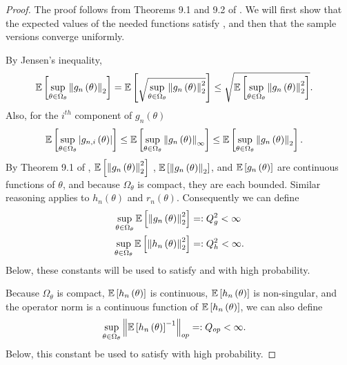 \begin{proof}
The proof follows from Theorems 9.1 and
9.2 of \citet{keener:2011:theoretical}. We will first show that the expected values of
the needed functions satisfy \coreassum, and then that the sample versions
converge uniformly.

By Jensen's inequality,
\begin{align*}
\mathbb{E}\left[\sup_{\theta\in\Omega_{\theta}}\left\Vert g_{n}\left(\theta\right)\right\Vert_{2}\right] & =\mathbb{E}\left[\sqrt{\sup_{\theta\in\Omega_{\theta}}\left\Vert g_{n}\left(\theta\right)\right\Vert_{2}^{2}}\right]\le\sqrt{\mathbb{E}\left[\sup_{\theta\in\Omega_{\theta}}\left\Vert g_{n}\left(\theta\right)\right\Vert_{2}^{2}\right]}.
\end{align*}
Also, for the $i^{th}$ component of $g_{n}\left(\theta\right)$
\begin{align*}
\mathbb{E}\left[\sup_{\theta\in\Omega_{\theta}}\left|g_{n,i}\left(\theta\right)\right|\right] & \le\mathbb{E}\left[\sup_{\theta\in\Omega_{\theta}}\left\Vert g_{n}\left(\theta\right)\right\Vert_{\infty}\right]\le\mathbb{E}\left[\sup_{\theta\in\Omega_{\theta}}\left\Vert g_{n}\left(\theta\right)\right\Vert_{2}\right].
\end{align*}
By Theorem 9.1 of \citet{keener:2011:theoretical}, $\mathbb{E}\left[\left\Vert g_{n}\left(\theta\right)\right\Vert_{2}^{2}\right]$
, $\mathbb{E}\left[\left\Vert g_{n}\left(\theta\right)\right\Vert_{2}\right]$, and $\mathbb{E}\left[g_{n}\left(\theta\right)\right]$
are continuous functions of $\theta$, and because $\Omega_{\theta}$
is compact, they are each bounded. Similar reasoning applies to $h_{n}\left(\theta\right)$
and $r_{n}\left(\theta\right)$. Consequently we can define
\begin{align*}
\sup_{\theta\in\Omega_{\theta}}\mathbb{E}\left[\left\Vert g_{n}\left(\theta\right)\right\Vert_{2}^{2}\right] & =:Q_{g}^{2}<\infty\\
\sup_{\theta\in\Omega_{\theta}}\mathbb{E}\left[\left\Vert h_{n}\left(\theta\right)\right\Vert_{2}^{2}\right] & =:Q_{h}^{2}<\infty.
\end{align*}
Below, these constants will be used to satisfy 
and  with high probability.

Because $\Omega_{\theta}$ is compact, $\mathbb{E}\left[h_{n}\left(\theta\right)\right]$
is continuous, $\mathbb{E}\left[h_{n}\left(\theta\right)\right]$ is non-singular,
and the operator norm is a continuous function of $\mathbb{E}\left[h_{n}\left(\theta\right)\right]$,
we can also define
\begin{align*}
\sup_{\theta\in\Omega_{\theta}}\left\Vert \mathbb{E}\left[h_{n}\left(\theta\right)\right]^{-1}\right\Vert_{op} & =:Q_{op}<\infty.
\end{align*}
Below, this constant be used to satisfy 
with high probability.


\end{proof}
